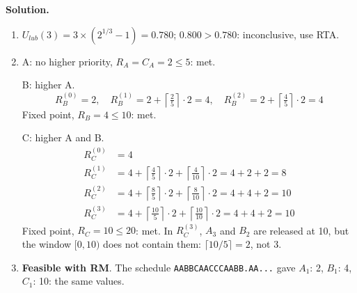 \textbf{Solution.}
\begin{enumerate}
    \item $U_{lub}(3) = 3 \times (2^{1/3} - 1) = 0.780$; $0.800 > 0.780$: inconclusive, use RTA.
    \item A: no higher priority, $R_A = C_A = 2 \le 5$: met.

    B: higher A.
    \[
    R_B^{(0)} = 2, \quad R_B^{(1)} = 2 + \left\lceil \tfrac{2}{5} \right\rceil \cdot 2 = 4, \quad R_B^{(2)} = 2 + \left\lceil \tfrac{4}{5} \right\rceil \cdot 2 = 4
    \]
    Fixed point, $R_B = 4 \le 10$: met.

    C: higher A and B.
    \[
    \begin{aligned}
    R_C^{(0)} &= 4 \\
    R_C^{(1)} &= 4 + \left\lceil \tfrac{4}{5} \right\rceil \cdot 2 + \left\lceil \tfrac{4}{10} \right\rceil \cdot 2 = 4 + 2 + 2 = 8 \\
    R_C^{(2)} &= 4 + \left\lceil \tfrac{8}{5} \right\rceil \cdot 2 + \left\lceil \tfrac{8}{10} \right\rceil \cdot 2 = 4 + 4 + 2 = 10 \\
    R_C^{(3)} &= 4 + \left\lceil \tfrac{10}{5} \right\rceil \cdot 2 + \left\lceil \tfrac{10}{10} \right\rceil \cdot 2 = 4 + 4 + 2 = 10
    \end{aligned}
    \]
    Fixed point, $R_C = 10 \le 20$: met. In $R_C^{(3)}$, $A_3$ and $B_2$ are released at 10, but the window $[0, 10)$ does not contain them: $\lceil 10/5 \rceil = 2$, not 3.
    \item \textbf{Feasible with RM}. The schedule \texttt{AABBCAACCCAABB.AA...} gave $A_1$: 2, $B_1$: 4, $C_1$: 10: the same values.
\end{enumerate}

